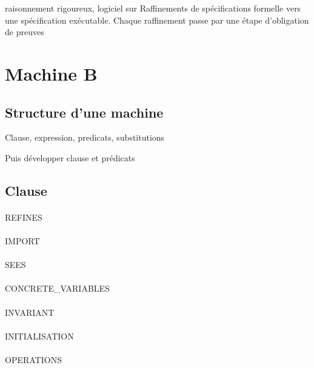 


raisonnement rigoureux, logiciel sur
Raffinements de spécifications formelle vers une spécification
exécutable. Chaque raffinement passe par une étape d'obligation de
preuves




\section{Machine B}

\subsection{Structure d'une machine}
Clause, expression, predicats, substitutions


Puis développer clause et prédicats

\subsection{Clause}

\paragraph{}
REFINES
\paragraph{}
IMPORT
\paragraph{}
SEES
\paragraph{}
CONCRETE\_VARIABLES
\paragraph{}
INVARIANT
\paragraph{}
INITIALISATION
\paragraph{}
OPERATIONS

